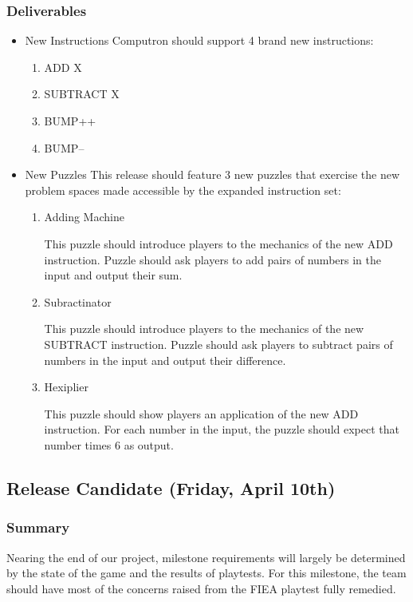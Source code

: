 \subsubsection*{Deliverables}
\begin{itemize}

  \item New Instructions
  Computron should support 4 brand new instructions:
  \begin{enumerate}
    \item ADD X
    \item SUBTRACT X
    \item BUMP++
    \item BUMP--
  \end{enumerate}
  
  \item New Puzzles
  This release should feature 3 new puzzles that exercise the new problem spaces made accessible by the expanded instruction set:

  \begin{enumerate}
    \item Adding Machine
    
    This puzzle should introduce players to the mechanics of the new ADD instruction. Puzzle should ask players to add pairs of numbers in the input and output their sum.

    \item Subractinator

    This puzzle should introduce players to the mechanics of the new SUBTRACT instruction. Puzzle should ask players to subtract pairs of numbers in the input and output their difference.

    \item Hexiplier

    This puzzle should show players an application of the new ADD instruction. For each number in the input, the puzzle should expect that number times 6 as output.

  \end{enumerate}

\end{itemize}

\subsection{Release Candidate (Friday, April 10th)}
\subsubsection*{Summary}
Nearing the end of our project, milestone requirements will largely be determined by the state of the game and the results of playtests. For this milestone, the team should have most of the concerns raised from the FIEA playtest fully remedied.

